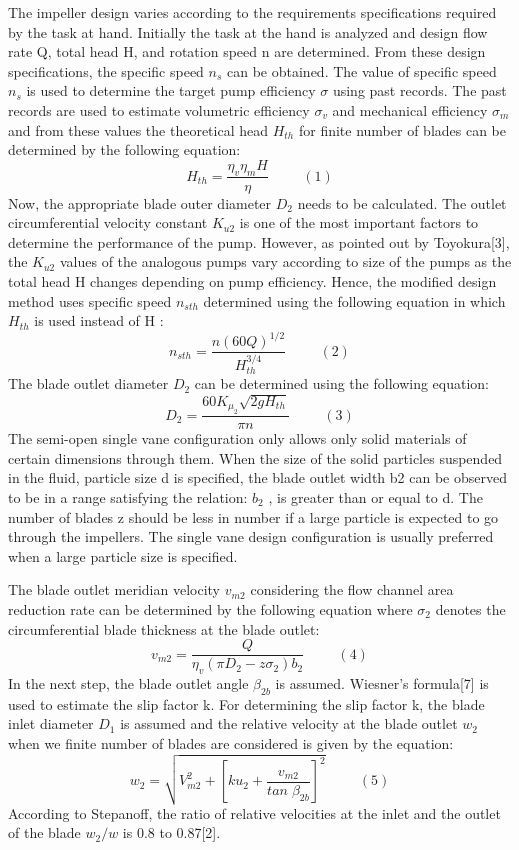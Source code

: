 \documentclass[11pt,a4paper]{scrartcl}
\begin{document}
The impeller design varies according to the requirements specifications required by the task at hand. Initially the task at the hand is analyzed and design flow rate Q, total head H, and rotation speed n are determined. From these design specifications, the specific speed $n_s$  can be obtained. The value of specific speed  $n_s$ is used to determine the target pump efficiency $\sigma$ using past records. The past records are used to estimate volumetric efficiency $\sigma_v$ and mechanical efficiency $\sigma_m$ and from these values the theoretical head $H_{th}$ for finite number of blades can be determined by the following equation:    
$$ H_{th}=\frac{\eta_v\eta_mH}{\eta}\hspace{1cm}(1)$$
Now, the appropriate blade outer diameter $D_2$ needs to be calculated. The outlet circumferential velocity constant $K_{u2}$ is one of the most important factors to determine the performance of the pump. However, as pointed out by Toyokura[3], the $K_{u2}$ values of the analogous pumps vary according to size of the pumps as the total head H changes depending on pump efficiency. Hence, the modified design method uses specific speed $n_{sth}$ determined using the following equation in which $H_{th}$ is used instead of H :
$$n_{sth}=\frac{n(60Q)^{1/2}}{H_{th}^{3/4}}\hspace{1cm}(2)$$
The blade outlet diameter $D_2$ can be determined using the following equation:
$$D_2=\frac{60K_{\mu_2}\sqrt{2gH_{th}}}{{\pi}n}\hspace{1cm}(3)$$
The semi-open single vane configuration only allows only solid materials of certain dimensions through them. When the size of the solid particles suspended in the fluid, particle size d is specified, the blade outlet width b2 can be observed to be in a range satisfying the relation: $b_2$ , is greater than or equal to d. The number of blades z should be less in number if a large particle is expected to go through the impellers. The single vane design configuration is usually preferred when a large particle size is specified. 

The blade outlet meridian velocity $v_{m2}$  considering the flow channel area reduction rate can be determined by the following equation where $\sigma_2$ denotes the circumferential blade thickness at the blade outlet:
$$v_{m2}=\frac{Q}{\eta_v({\pi}D_{2}-z\sigma_2)b_2}\hspace{1cm}(4)$$
In the next step, the blade outlet angle $\beta_{2b}$ is assumed. Wiesner’s formula[7] is used to estimate the slip factor k. For determining the slip factor k, the blade inlet diameter $D_1$ is assumed and the relative velocity at the blade outlet $w_2$ when we finite number of blades are considered is given by the equation:
$$w_2=\sqrt{V^2_{m2}+\left[ku_2+\frac{v_{m2}}{tan\;\beta_{2b}}\right]^2}\hspace{1cm}(5)$$
According to Stepanoff, the ratio of relative velocities at the inlet and the outlet of the blade $w_2/w$ is 0.8 to 0.87[2]. 
\end{document}
